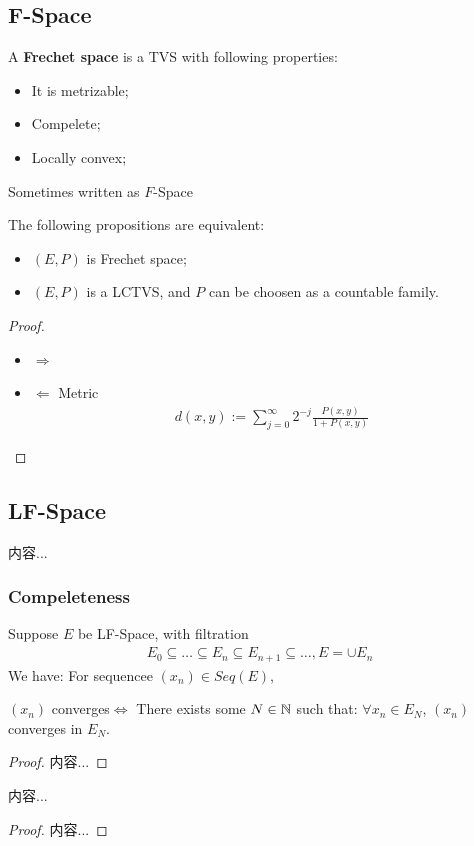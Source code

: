 \documentclass[Total.tex]{subfiles}
\begin{document}
	\subsection{F-Space}
	\begin{Def}
		A \textbf{Frechet space} is a TVS with following properties:
		\begin{itemize}
			\item It is metrizable;
			\item Compelete;
			\item Locally convex;
		\end{itemize}
		Sometimes written as $F$-Space
	\end{Def}
	\begin{proposition}
		The following propositions are equivalent:
		\begin{itemize}
			\item $(E,P)$ is Frechet space;
			\item $(E,P)$ is a LCTVS, and $P$ can be choosen as a countable family.
		\end{itemize}
	\end{proposition}
	\begin{proof}
		\begin{itemize}
			\item $\Rightarrow$
			\item $\Leftarrow$ Metric
			\begin{gather*}
				d(x,y):=\sum_{j=0}^\infty 2^{-j}\frac{P(x,y)}{1+P(x,y)}
			\end{gather*}
		\end{itemize}
	\end{proof}
	\subsection{LF-Space}
	\begin{Def}
		内容...
	\end{Def}
	\subsubsection{Compeleteness}
	\begin{lemma}
		Suppose $E$ be LF-Space, with filtration
		\begin{gather*}
			E_0\subseteq\dots\subseteq E_n\subseteq E_{n+1}\subseteq \dots,E=\cup E_n
		\end{gather*}
		We have: For sequencee $(x_n)\in Seq(E)$,
		\begin{center}
			$(x_n)$ converges$\Leftrightarrow$ There exists some $N\in \mathbb{N}$ such that: $\forall x_n\in E_N$, $(x_n)$ converges in $E_N$.
		\end{center}
	\end{lemma}
	\begin{proof}
		内容...
	\end{proof}
	\begin{proposition}
		内容...
	\end{proposition}
	\begin{proof}
		内容...
	\end{proof}
\end{document}
